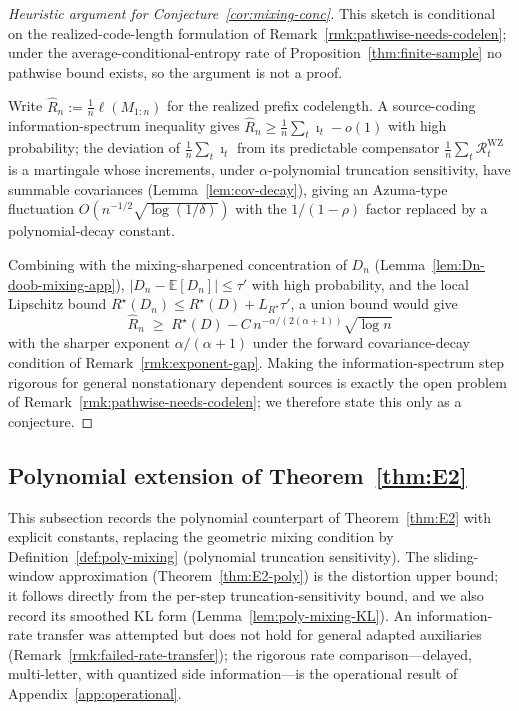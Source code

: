 \documentclass[11pt]{article}
\newcommand{\E}{\mathbb{E}}
\theoremstyle{plain}
\theoremstyle{definition}
\theoremstyle{remark}
\begin{document}
\begin{proof}[Heuristic argument for Conjecture~\ref{cor:mixing-conc}]
This sketch is conditional on the realized-code-length formulation of
Remark~\ref{rmk:pathwise-needs-codelen}; under the
average-conditional-entropy rate of Proposition~\ref{thm:finite-sample}
no pathwise bound exists, so the argument is not a proof.

Write $\widehat R_n := \tfrac1n\ell(M_{1:n})$ for the realized prefix
codelength. A source-coding information-spectrum inequality gives
$\widehat R_n \ge \tfrac1n\sum_t\imath_t - o(1)$ with high probability;
the deviation of $\tfrac1n\sum_t\imath_t$ from its predictable
compensator $\tfrac1n\sum_t\mathcal{R}_t^{\mathrm{WZ}}$ is a martingale
whose increments, under $\alpha$-polynomial truncation sensitivity,
have summable covariances (Lemma~\ref{lem:cov-decay}), giving an
Azuma-type fluctuation $O(n^{-1/2}\sqrt{\log(1/\delta)})$ with the
$1/(1-\rho)$ factor replaced by a polynomial-decay constant.

Combining with the mixing-sharpened concentration of $D_n$
(Lemma~\ref{lem:Dn-doob-mixing-app}), $|D_n-\E[D_n]|\le\tau'$ with high
probability, and the local Lipschitz bound
$R^\star(D_n)\le R^\star(D)+L_{R^\star}\tau'$, a union bound would give
\[
\widehat R_n \;\ge\; R^\star(D) - C\,n^{-\alpha/(2(\alpha+1))}\sqrt{\log n}
\]
with the sharper exponent $\alpha/(\alpha+1)$ under the forward
covariance-decay condition of Remark~\ref{rmk:exponent-gap}. Making the
information-spectrum step rigorous for general nonstationary dependent
sources is exactly the open problem of
Remark~\ref{rmk:pathwise-needs-codelen}; we therefore state this only
as a conjecture.
\end{proof}

\subsection{Polynomial extension of Theorem~\ref{thm:E2}}
\label{app:polynomial-extension}

This subsection records the polynomial counterpart of
Theorem~\ref{thm:E2} with explicit constants, replacing the
geometric mixing condition by Definition~\ref{def:poly-mixing}
(polynomial truncation sensitivity). The sliding-window
approximation (Theorem~\ref{thm:E2-poly}) is the distortion upper
bound; it follows directly from the per-step truncation-sensitivity
bound, and we also record its smoothed KL form
(Lemma~\ref{lem:poly-mixing-KL}). An information-rate transfer was
attempted but does not hold for general adapted auxiliaries
(Remark~\ref{rmk:failed-rate-transfer}); the rigorous rate
comparison---delayed, multi-letter, with quantized side
information---is the operational result of
Appendix~\ref{app:operational}.
\end{document}
